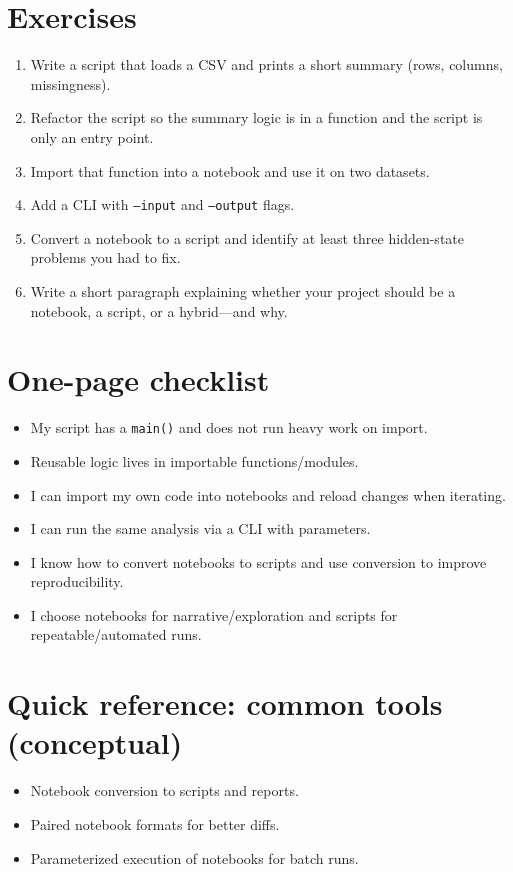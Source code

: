\section{Exercises}
\begin{enumerate}
\item Write a script that loads a CSV and prints a short summary (rows, columns, missingness).
\item Refactor the script so the summary logic is in a function and the script is only an entry point.
\item Import that function into a notebook and use it on two datasets.
\item Add a CLI with \texttt{--input} and \texttt{--output} flags.
\item Convert a notebook to a script and identify at least three hidden-state problems you had to fix.
\item Write a short paragraph explaining whether your project should be a notebook, a script, or a hybrid---and why.
\end{enumerate}

\section{One-page checklist}
\begin{itemize}
\item My script has a \texttt{main()} and does not run heavy work on import.
\item Reusable logic lives in importable functions/modules.
\item I can import my own code into notebooks and reload changes when iterating.
\item I can run the same analysis via a CLI with parameters.
\item I know how to convert notebooks to scripts and use conversion to improve reproducibility.
\item I choose notebooks for narrative/exploration and scripts for repeatable/automated runs.
\end{itemize}

\section{Quick reference: common tools (conceptual)}
\begin{itemize}
\item Notebook conversion to scripts and reports.
\item Paired notebook formats for better diffs.
\item Parameterized execution of notebooks for batch runs.
\end{itemize}

